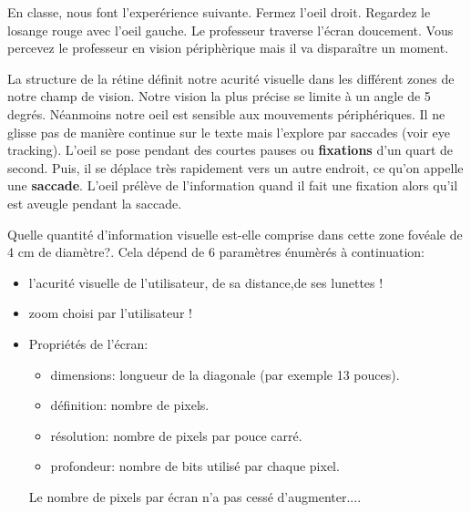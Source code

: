 En classe, nous font l'exper\'erience suivante. Fermez l'oeil droit. Regardez le losange rouge avec l'oeil gauche. Le professeur traverse l'\'ecran doucement. Vous percevez le professeur en vision p\'eriph\`erique mais il va dispara\^itre un moment.

La structure de la r\'etine d\'efinit notre acurit\'e visuelle dans les diff\'erent zones de notre champ de vision. Notre vision la plus pr\'ecise se limite \`a un angle de 5 degr\'es. N\'eanmoins notre oeil est sensible aux mouvements p\'eriph\'eriques. Il ne glisse pas de mani\`ere continue sur le texte mais l'explore par saccades (voir eye tracking). L'oeil se pose pendant des courtes pauses ou \textbf{fixations} d'un quart de second. Puis, il se d\'eplace tr\`es rapidement vers un autre endroit, ce qu'on appelle une \textbf{saccade}. L'oeil pr\'el\`eve de l'information quand il fait une fixation alors qu'il est aveugle pendant la saccade.

\begin{figure}[H]
\centering
{}
\end{figure}

Quelle quantit\'e d'information visuelle est-elle comprise dans cette zone fov\'eale de 4 cm de diam\`etre?. Cela d\'epend de 6 param\`etres \'enum\`er\'es \`a continuation:

\begin{itemize}
\item l'acurit\'e visuelle de l'utilisateur, de sa distance,de ses lunettes !
\item zoom choisi par l'utilisateur ! 
\item Propri\'et\'es de l'\'ecran:
\begin{itemize}
\item dimensions: longueur de la diagonale (par exemple 13 pouces).
\item d\'efinition: nombre de pixels.
\item r\'esolution: nombre de pixels par pouce carré.
\item profondeur: nombre de bits utilis\'e par chaque pixel.
\end{itemize}

Le	nombre	de	pixels	par	\'ecran	n'a	pas	cess\'e	d’augmenter....
\end{itemize}


